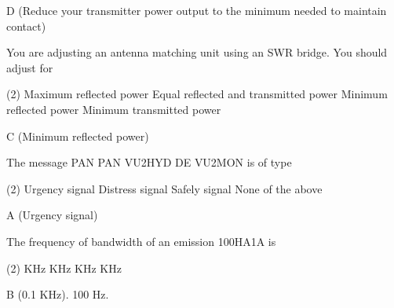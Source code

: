 \documentclass[a4paper]{article}
\begin{document}
\begin{solution}
	D (Reduce your transmitter power output to the minimum needed to maintain contact)
\end{solution}

\vspace{5mm}



\begin{question}You are adjusting an antenna matching unit using an SWR bridge. You should adjust for
	\begin{tasks}(2)
		\task Maximum reflected power
		\task Equal reflected and transmitted power
		\task Minimum reflected power
		\task Minimum transmitted power
	\end{tasks}
\end{question}

\begin{solution}
	C (Minimum reflected power)
\end{solution}

\vspace{5mm}



\begin{question}The message \apostrophe{}PAN PAN VU2HYD DE VU2MON\apostrophe{} is of type
	\begin{tasks}(2)
		\task Urgency signal
		\task Distress signal
		\task Safely signal
		\task None of the above
	\end{tasks}
\end{question}

\begin{solution}
	A (Urgency signal)
\end{solution}

\vspace{5mm}



\begin{question}The frequency of bandwidth of an emission \apostrophe{}100HA1A\apostrophe{} is
	\begin{tasks}(2)
		 KHz
		 KHz
		 KHz
		 KHz
	\end{tasks}
\end{question}

\begin{solution}
	B (0.1 KHz). 100 Hz.
\end{solution}

\vspace{5mm}
\end{document}
